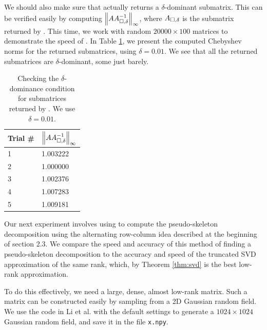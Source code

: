 \documentclass{article}
\begin{document}
	We should also make sure that \maxvol{} actually returns a $\delta$-dominant submatrix. This can be verified easily by computing $\left\lVert AA_{\square,\delta}^{-1} \right\rVert_\infty$, where $A_{\square,\delta}$ is the submatrix returned by \maxvol{}. This time, we work with random $20000\times 100$ matrices to demonstrate the speed of \maxvol{}. In Table \ref{table:delta_dominance}, we present the computed Chebyshev norms for the returned submatrices, using $\delta = 0.01$. We see that all the returned submatrices are $\delta$-dominant, some just barely.
	
	\begin{table}[h]
		\centering
		\begin{tabular}{@{}ll@{}}
			\toprule
			Trial \# & $\left\lVert AA_{\square,\delta}^{-1} \right\rVert_\infty$ \\
			\midrule
			1 & 1.003222\\
			2 & 1.000000\\
			3 & 1.002376\\
			4 & 1.007283\\
			5 & 1.009181\\
			\bottomrule
		\end{tabular}
		\caption{Checking the $\delta$-dominance condition for submatrices returned by \maxvol{}. We use $\delta = 0.01$.}
		\label{table:delta_dominance}
	\end{table}
	
	
	Our next experiment involves using \maxvol{} to compute the pseudo-skeleton decomposition using the alternating row-column idea described at the beginning of section 2.3. We compare the speed and accuracy of this method of finding a pseudo-skeleton decomposition to the accuracy and speed of the truncated SVD approximation of the same rank, which, by Theorem \ref{thm:svd} is the best low-rank approximation.
	
	To do this effectively, we need a large, dense, almost low-rank matrix. Such a matrix can be constructed easily by sampling from a 2D Gaussian random field. We use the code in Li et al. \cite{li_2023a} with the default settings to generate a $1024\times 1024$ Gaussian random field, and save it in the file \texttt{x.npy}.
	
\end{document}
